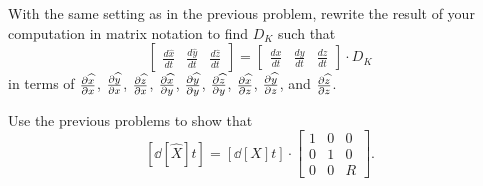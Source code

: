 \documentclass{ximera}
\begin{document}
\begin{problem}
  With the same setting as in the previous problem, rewrite the result
  of your computation in matrix notation to find $D_K$ such that
\[
\begin{bmatrix}
\frac{d\hat{x}}{dt} & \frac{d\hat{y}}{dt} & \frac{d\hat{z}}{dt}%
\end{bmatrix}
=
\begin{bmatrix}
\frac{dx}{dt} & \frac{dy}{dt} & \frac{dz}{dt}%
\end{bmatrix}\cdot D_K
\]
in terms of $\pp[\hat x]{x}$, $\pp[\hat y]{x}$, $\pp[\hat z]{x}$,
$\pp[\hat x]{y}$, $\pp[\hat y]{y}$, $\pp[\hat z]{y}$, $\pp[\hat x]{z}$,
$\pp[\hat y]{z}$, and $\pp[\hat z]{z}$.
\end{problem}


\begin{problem}
  Use the previous problems to show that
  \[
  \left[\dd[\hat{X}]{t}\right] = \left[ \dd[X]{t}\right] \cdot
  \begin{bmatrix}
    1 & 0 & 0\\
    0 & 1 & 0\\
    0 & 0 & R
  \end{bmatrix}.
  \]
\end{problem}
\end{document}
